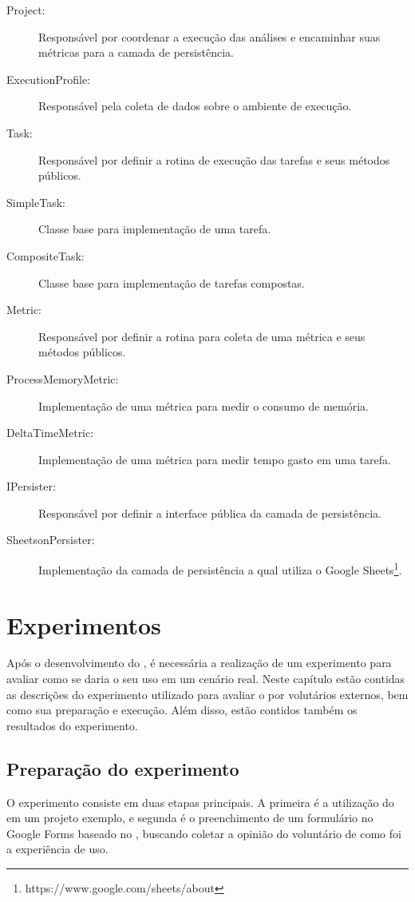 \documentclass[12pt]{tcc}
\begin{document}
\begin{description}
	\item[Project:] Responsável por coordenar a execução das análises e encaminhar suas métricas para a camada de persistência.
	\item[ExecutionProfile:] Responsável pela coleta de dados sobre o ambiente de execução.
	\item[Task:] Responsável por definir a rotina de execução das tarefas e seus métodos públicos.
	\item[SimpleTask:] Classe base para implementação de uma tarefa.
	\item[CompositeTask:] Classe base para implementação de tarefas compostas.
	\item[Metric:] Responsável por definir a rotina para coleta de uma métrica e seus métodos públicos.
	\item[ProcessMemoryMetric:] Implementação de uma métrica para medir o consumo de memória.
	\item[DeltaTimeMetric:] Implementação de uma métrica para medir tempo gasto em uma tarefa.
	\item[IPersister:] Responsável por definir a interface pública da camada de persistência.
	\item[SheetsonPersister:] Implementação da camada de persistência a qual utiliza o Google Sheets\footnote{https://www.google.com/sheets/about}.
\end{description}


\chapter{Experimentos}
\label{cap:experimentos}

Após o desenvolvimento do , é necessária a realização de um experimento para avaliar como se daria o seu uso em um cenário real. Neste capítulo estão contidas as descrições do experimento utilizado para avaliar o  por volutários externos, bem como sua preparação e execução. Além disso, estão contidos também os resultados do experimento.

\section{Preparação do experimento}
\label{section:preparacao-experimento}

O experimento consiste em duas etapas principais. A primeira é a utilização do  em um projeto exemplo, e segunda é o preenchimento de um formulário no Google Forms baseado no , buscando coletar a opinião do voluntário de como foi a experiência de uso.
\end{document}
